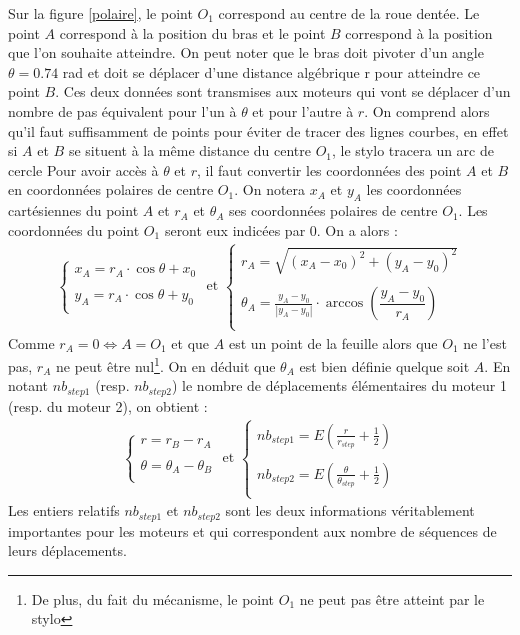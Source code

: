 \documentclass[12pt,a4paper]{report}
\begin{document}
Sur la figure \ref{polaire}, le point $O_1$ correspond au centre de la roue dentée. Le point $A$ correspond à la position du bras et le point $B$ correspond à la position que l'on souhaite atteindre. On peut noter que le bras doit pivoter d'un angle $\theta = 0.74$ rad et doit se déplacer d'une distance algébrique r pour atteindre ce point $B$. Ces deux données sont transmises aux moteurs qui vont se déplacer d'un nombre de pas équivalent pour l'un à $\theta$ et pour l'autre à $r$. On comprend alors qu'il faut suffisamment de points pour éviter de tracer des lignes courbes, en effet si $A$ et $B$ se situent à la même distance du centre $O_1$, le stylo tracera un arc de cercle
Pour avoir accès à $\theta$ et $r$, il faut convertir les coordonnées des point $A$ et $B$ en coordonnées polaires de centre $O_1$. On notera $x_A$ et $y_A$ les coordonnées cartésiennes du point $A$ et $r_A$ et $\theta_A$ ses coordonnées polaires de centre $O_1$. Les coordonnées du point $O_1$ seront eux indicées par 0. On a alors :
\begin{align*}
\left\{
\begin{array}{c}
	x_A = r_A \cdot \cos \theta + x_0 \\ \\
	y_A = r_A \cdot \cos \theta + y_0  \\
\end{array}
\right.
\mbox{ et }
\left\{
\begin{array}{c}
	r_A = \sqrt{(x_A - x_0)^2 + (y_A - y_0)^2} \\ \\
	\theta_A = \frac{y_A - y_0}{|y_A - y_0|} \cdot \arccos \left( \dfrac{y_A - y_0}{r_A} \right) \\
\end{array}
\right.
\end{align*}
Comme $r_A = 0 \iff A = O_1$ et que $A$ est un point de la feuille alors que $O_1$ ne l'est pas, $r_A$ ne peut être nul\footnote{De plus, du fait du mécanisme, le point $O_1$ ne peut pas être atteint par le stylo}. On en déduit que $\theta_A$ est bien définie quelque soit $A$. En notant $nb_{step1}$ (resp. $nb_{step2}$) le nombre de déplacements élémentaires du moteur 1 (resp. du moteur 2), on obtient :
\begin{align*}
\left\{
\begin{array}{c}
	r = r_B - r_A \\ \\
	\theta = \theta_A - \theta_B  \\
\end{array}
\right.
\mbox{ et }
\left\{
\begin{array}{c}
	nb_{step1} = E(\frac{r}{r_{step}} + \frac{1}{2})\\ \\
	nb_{step2} = E(\frac{\theta}{\theta_{step}} + \frac{1}{2})\\
\end{array}
\right. 
\end{align*}
Les entiers relatifs $nb_{step1}$ et $nb_{step2}$ sont les deux informations véritablement importantes pour les moteurs et qui correspondent aux nombre de séquences de leurs déplacements.
\end{document}
